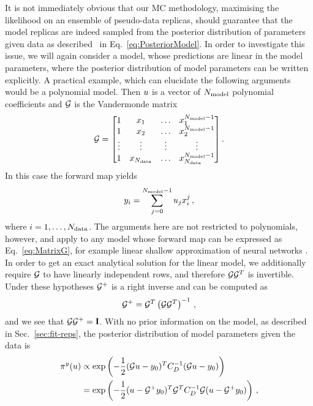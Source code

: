 It is not immediately obvious that our MC methodology, maximising the likelihood
on an ensemble of pseudo-data replicas, should guarantee that the model replicas
are indeed sampled from the posterior distribution of parameters given data as
described \eg\ in Eq.~\ref{eq:PosteriorModel}. In order to investigate this
issue, we will again consider a model, whose predictions are linear in the model
parameters, where the posterior distribution of model parameters can be written
explicitly. A practical example, which can
elucidate the following arguments would be a polynomial model. Then $u$ is a
vector of $N_{\rm model}$ polynomial coefficients and $\mathcal{G}$ is the Vandermonde matrix
\begin{equation}
    \mathcal{G} =
    \begin{bmatrix}
        1  & x_1 & \ldots& x_1^{N_{\rm model}-1} \\ 
        1  & x_2 & \ldots& x_2^{N_{\rm model}-1} \\ 
        \vdots  & \vdots & \vdots& \vdots \\ 
        1  & x_{N_{\rm data}} & \ldots & x_{N_{\rm data}}^{N_{\rm model}-1} 
    \end{bmatrix}.
\end{equation}
In this case the forward map yields
\begin{equation}
    \label{eq:PolyMod}
    y_i = \sum_{j=0}^{N_{\rm model}-1} u_j x_i^j\, , 
\end{equation}
where $i=1,\ldots,N_{\rm data}$. The arguments here are not restricted to polynomials,
however, and apply to any model whose forward map can be expressed as
Eq.~\eqref{eq:MatrixG}, for example linear shallow approximation of neural
networks \cite{ADVANI2020428}. In order to get an exact analytical solution
for the linear model, we additionally require $\mathcal{G}$ to have linearly
independent rows, and therefore $\mathcal{G} \mathcal{G}^T$ is invertible. Under these
hypotheses $\mathcal{G}^+$ is a
right inverse and can be computed as
\begin{equation}
    \label{eq:RightInverse}
    \mathcal{G}^+ = \mathcal{G}^T \left(\mathcal{G} \mathcal{G}^T\right)^{-1}\, ,
\end{equation}
and we see that $\mathcal{G} \mathcal{G}^+ = \mathbf{I}$. With no prior information
on the model, as described in Sec.~\ref{sec:fit-reps}, the posterior
distribution of model parameters given the data is
\begin{equation}
    \label{eq:PosteriorMultiGaussModel}
    \begin{split}
        \pi^y(u) &\propto
        \exp \left(
            -\frac12 (\mathcal{G} u - y_0)^T
            C_{D}^{-1}
            (\mathcal{G} u - y_0)
        \right) \\
        &= \exp \left(
            -\frac12 (u - \mathcal{G}^+ y_0)^T
            \mathcal{G}^T C_{D}^{-1} \mathcal{G}
            (u - \mathcal{G}^+ y_0)
        \right)\, ,
    \end{split}
\end{equation}
